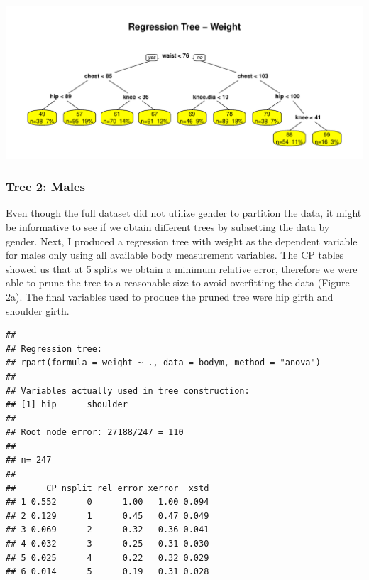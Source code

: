 \documentclass[11pt]{article}\usepackage[]{graphicx}\usepackage[]{color}
\makeatletter
\def\maxwidth{ %
  \ifdim\Gin@nat@width>\linewidth
    \linewidth
  \else
    \Gin@nat@width
  \fi
}
\newenvironment{kframe}{%
 \def\at@end@of@kframe{}%
 \ifinner\ifhmode%
  \def\at@end@of@kframe{\end{minipage}}%
  \begin{minipage}{\columnwidth}%
 \fi\fi%
 \def\FrameCommand##1{\hskip\@totalleftmargin \hskip-\fboxsep
 \colorbox{shadecolor}{##1}\hskip-\fboxsep
     \hskip-\linewidth \hskip-\@totalleftmargin \hskip\columnwidth}%
 \MakeFramed {\advance\hsize-\width
   \@totalleftmargin\z@ \linewidth\hsize
   \@setminipage}}%
 {\par\unskip\endMakeFramed%
 \at@end@of@kframe}
\newenvironment{knitrout}{}{} %
\makeatother
\begin{document}
\begin{knitrout}
\color{fgcolor}
\includegraphics[width=\maxwidth]{figure/wt} 

\end{knitrout}


\subsubsection{Tree 2: Males} 
Even though the full dataset did not utilize gender to partition the data, it might be informative to see if we obtain different trees by subsetting the data by gender. Next, I produced a regression tree with weight as the dependent variable for males only using all available body measurement variables. The CP tables showed us that at 5 splits we obtain a minimum relative error, therefore we were able to prune the tree to a reasonable size to avoid overfitting the data (Figure 2a). The final variables used to produce the pruned tree were hip girth and shoulder girth.\\

\begin{knitrout}
\color{fgcolor}\begin{kframe}
\begin{verbatim}
## 
## Regression tree:
## rpart(formula = weight ~ ., data = bodym, method = "anova")
## 
## Variables actually used in tree construction:
## [1] hip      shoulder
## 
## Root node error: 27188/247 = 110
## 
## n= 247 
## 
##      CP nsplit rel error xerror  xstd
## 1 0.552      0      1.00   1.00 0.094
## 2 0.129      1      0.45   0.47 0.049
## 3 0.069      2      0.32   0.36 0.041
## 4 0.032      3      0.25   0.31 0.030
## 5 0.025      4      0.22   0.32 0.029
## 6 0.014      5      0.19   0.31 0.028
\end{verbatim}
\end{kframe}
\end{knitrout}
\end{document}
